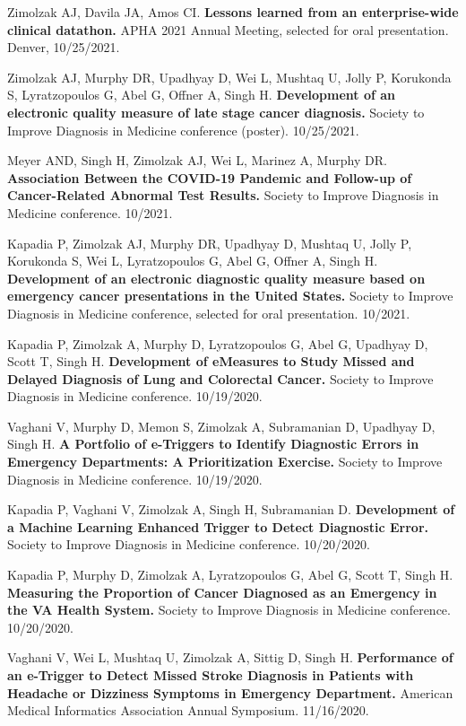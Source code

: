 \documentclass[10pt]{article}
\begin{document}
Zimolzak AJ, Davila JA, Amos CI. \textbf{Lessons learned from an
  enterprise-wide clinical datathon.} APHA 2021 Annual Meeting,
selected for oral presentation. Denver, 10/25/2021.


Zimolzak AJ, Murphy DR, Upadhyay D, Wei L, Mushtaq U, Jolly P,
Korukonda S, Lyratzopoulos G, Abel G, Offner A, Singh H.
\textbf{Development of an electronic quality measure of late stage
  cancer diagnosis.} Society to Improve Diagnosis in Medicine
conference (poster). 10/25/2021.

Meyer AND, Singh H, Zimolzak AJ, Wei L, Marinez A, Murphy DR.
\textbf{Association Between the COVID-19 Pandemic and Follow-up of
  Cancer-Related Abnormal Test Results.} Society to Improve Diagnosis
in Medicine conference. 10/2021.

Kapadia P, Zimolzak AJ, Murphy DR, Upadhyay D, Mushtaq U, Jolly P,
Korukonda S, Wei L, Lyratzopoulos G, Abel G, Offner A, Singh H.
\textbf{Development of an electronic diagnostic quality measure based
  on emergency cancer presentations in the United States.} Society to
Improve Diagnosis in Medicine conference, selected for oral
presentation. 10/2021.


Kapadia P, Zimolzak A, Murphy D, Lyratzopoulos G, Abel G, Upadhyay D,
Scott T, Singh H. \textbf{Development of eMeasures to Study Missed and
  Delayed Diagnosis of Lung and Colorectal Cancer.} Society to Improve
Diagnosis in Medicine conference. 10/19/2020.

Vaghani V, Murphy D, Memon S, Zimolzak A, Subramanian D, Upadhyay D,
Singh H. \textbf{A Portfolio of e-Triggers to Identify Diagnostic
  Errors in Emergency Departments: A Prioritization Exercise.} Society
to Improve Diagnosis in Medicine conference. 10/19/2020.

Kapadia P, Vaghani V, Zimolzak A, Singh H, Subramanian D.
\textbf{Development of a Machine Learning Enhanced Trigger to Detect
  Diagnostic Error.} Society to Improve Diagnosis in Medicine
conference. 10/20/2020.

Kapadia P, Murphy D, Zimolzak A, Lyratzopoulos G, Abel G, Scott T,
Singh H. \textbf{Measuring the Proportion of Cancer Diagnosed as an
  Emergency in the VA Health System.} Society to Improve Diagnosis in
Medicine conference. 10/20/2020.


Vaghani V, Wei L, Mushtaq U, Zimolzak A, Sittig D, Singh H.
\textbf{Performance of an e-Trigger to Detect Missed Stroke Diagnosis
  in Patients with Headache or Dizziness Symptoms in Emergency
  Department.} American Medical Informatics Association Annual
Symposium. 11/16/2020.
\end{document}
